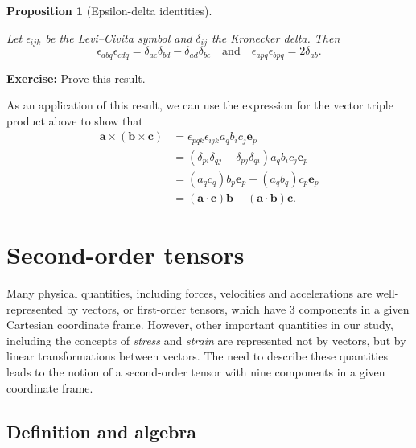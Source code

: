 \documentclass[
  letterpaper,
  DIV=11,
  numbers=noendperiod]{scrreprt}
\theoremstyle{plain}
\newtheorem{proposition}{Proposition}[chapter]
\theoremstyle{remark}
\begin{document}
\begin{proposition}[Epsilon-delta
identities]\protect\hypertarget{prp-epsilondelta}{}\label{prp-epsilondelta}

Let \(\epsilon_{ijk}\) be the Levi--Civita symbol and \(\delta_{ij}\)
the Kronecker delta. Then
\[\epsilon_{abq}\epsilon_{cdq} = \delta_{ac}\delta_{bd}-\delta_{ad}\delta_{bc}\quad\text{and}\quad
    \epsilon_{apq}\epsilon_{bpq} = 2\delta_{ab}.\]

\end{proposition}

\textbf{Exercise:} Prove this result.

As an application of this result, we can use the expression for the
vector triple product above to show that \[\begin{aligned}
  {\boldsymbol{a}}\times({\boldsymbol{b}}\times{\boldsymbol{c}})
  &= \epsilon_{pqk}\epsilon_{ijk}a_qb_ic_j{\boldsymbol{e}}_p\\
  &= (\delta_{pi}\delta_{qj}-\delta_{pj}\delta_{qi})a_qb_ic_j{\boldsymbol{e}}_p\\
  &= (a_qc_q)b_p{\boldsymbol{e}}_p-(a_qb_q)c_p{\boldsymbol{e}}_p\\
  &=({\boldsymbol{a}}\cdot{\boldsymbol{c}}){\boldsymbol{b}}-({\boldsymbol{a}}\cdot{\boldsymbol{b}}){\boldsymbol{c}}.
\end{aligned}\]

\section{Second-order tensors}\label{sec:second-order-tensors}

Many physical quantities, including forces, velocities and accelerations
are well-represented by vectors, or first-order tensors, which have 3
components in a given Cartesian coordinate frame. However, other
important quantities in our study, including the concepts of
\emph{stress} and \emph{strain} are represented not by vectors, but by
linear transformations between vectors. The need to describe these
quantities leads to the notion of a second-order tensor with nine
components in a given coordinate frame.

\subsection{Definition and algebra}\label{definition-and-algebra}
\end{document}

